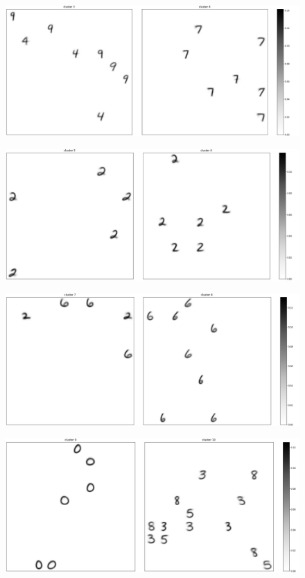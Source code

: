 \documentclass[a4paper]{report}
\begin{document}
\begin{figure} [H]
    \centering
    \includegraphics [width=\textwidth ] {c/e/3.png}
    \caption{}
\end{figure}

\begin{figure} [H]
    \centering
    \includegraphics [width=\textwidth ] {c/e/5.png}
    \caption{}
\end{figure}

\begin{figure} [H]
    \centering
    \includegraphics [width=\textwidth ] {c/e/7.png}
    \caption{}
\end{figure}

\begin{figure} [H]
    \centering
    \includegraphics [width=\textwidth ] {c/e/9.png}
    \caption{}
\end{figure}
\end{document}
